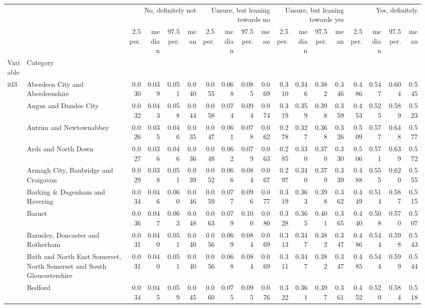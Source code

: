 \begin{tabular}{llrrrrrrrrrrrrrrrr}
\toprule
 &  & \multicolumn{4}{r}{No, definitely not} & \multicolumn{4}{r}{Unsure, but leaning towards no} & \multicolumn{4}{r}{Unsure, but leaning towards yes} & \multicolumn{4}{r}{Yes, definitely} \\
 &  & 2.5 per. & median & 97.5 per. & mean & 2.5 per. & median & 97.5 per. & mean & 2.5 per. & median & 97.5 per. & mean & 2.5 per. & median & 97.5 per. & mean \\
Variable & Category &  &  &  &  &  &  &  &  &  &  &  &  &  &  &  &  \\
\midrule
\multirow[t]{176}{*}{itl3} & Aberdeen City and Aberdeenshire & 0.030 & 0.039 & 0.051 & 0.040 & 0.055 & 0.068 & 0.085 & 0.069 & 0.310 & 0.346 & 0.382 & 0.346 & 0.486 & 0.547 & 0.604 & 0.545 \\
 & Angus and Dundee City & 0.032 & 0.043 & 0.058 & 0.044 & 0.058 & 0.074 & 0.094 & 0.074 & 0.319 & 0.359 & 0.398 & 0.359 & 0.453 & 0.525 & 0.589 & 0.523 \\
 & Antrim and Newtownabbey & 0.026 & 0.035 & 0.046 & 0.035 & 0.047 & 0.061 & 0.078 & 0.062 & 0.278 & 0.327 & 0.368 & 0.326 & 0.509 & 0.577 & 0.648 & 0.577 \\
 & Ards and North Down & 0.027 & 0.036 & 0.046 & 0.036 & 0.048 & 0.062 & 0.079 & 0.063 & 0.285 & 0.330 & 0.370 & 0.330 & 0.506 & 0.571 & 0.639 & 0.572 \\
 & Armagh City, Banbridge and Craigavon & 0.029 & 0.038 & 0.051 & 0.039 & 0.052 & 0.066 & 0.084 & 0.067 & 0.297 & 0.340 & 0.379 & 0.339 & 0.488 & 0.555 & 0.620 & 0.555 \\
 & Barking \& Dagenham and Havering & 0.034 & 0.046 & 0.060 & 0.046 & 0.059 & 0.077 & 0.096 & 0.077 & 0.319 & 0.363 & 0.398 & 0.362 & 0.449 & 0.514 & 0.587 & 0.515 \\
 & Barnet & 0.036 & 0.047 & 0.063 & 0.048 & 0.063 & 0.079 & 0.100 & 0.080 & 0.328 & 0.365 & 0.401 & 0.365 & 0.440 & 0.508 & 0.570 & 0.507 \\
 & Barnsley, Doncaster and Rotherham & 0.031 & 0.040 & 0.051 & 0.040 & 0.056 & 0.069 & 0.084 & 0.069 & 0.313 & 0.347 & 0.382 & 0.347 & 0.486 & 0.544 & 0.598 & 0.543 \\
 & Bath and North East Somerset, North Somerset and South Gloucestershire & 0.031 & 0.040 & 0.051 & 0.040 & 0.056 & 0.068 & 0.084 & 0.069 & 0.311 & 0.347 & 0.382 & 0.347 & 0.485 & 0.544 & 0.599 & 0.544 \\
 & Bedford & 0.034 & 0.045 & 0.059 & 0.045 & 0.060 & 0.075 & 0.095 & 0.076 & 0.322 & 0.361 & 0.397 & 0.361 & 0.452 & 0.520 & 0.584 & 0.518 \\

\end{tabular}
